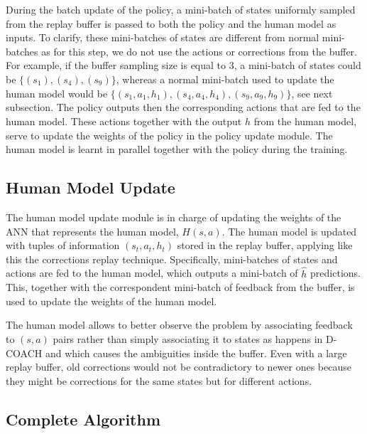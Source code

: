 During the batch update of the policy, a mini-batch of states uniformly sampled from the replay buffer is passed to both the policy and the human model as inputs. To clarify, these mini-batches of states are different from normal mini-batches as for this step, we do not use the actions or corrections from the buffer. For example, if the buffer sampling size is equal to 3, a mini-batch of states could be  $\{(s_1), (s_4), (s_9)\}$, whereas a normal mini-batch used to update the human model would be $\{(s_1, a_1, h_1), (s_4, a_4, h_4), (s_9, a_9, h_9)\}$, see next subsection. The policy outputs then the corresponding actions that are fed to the human model. These actions together with the output $\hat{h}$ from the human model, serve to update the weights of the policy in the policy update module. The human model is learnt in parallel together with the policy during the training. 



\subsection*{Human Model Update}

The human model update module is in charge of updating the weights of the ANN that represents the human model, $H(s, a)$. The human model is updated with tuples of information $(s_t, a_t, h_t)$ stored in the replay buffer, applying like this the corrections replay technique. Specifically, mini-batches of states and actions are fed to the human model, which outputs a mini-batch of $\hat{h}$ predictions. This, together with the correspondent mini-batch of feedback from the buffer, is used to update the weights of the human model.


The human model allows to better observe the problem by associating feedback to $(s, a)$ pairs rather than simply associating it to states as happens in D-COACH and which causes the ambiguities inside the buffer. Even with a large replay buffer, old corrections would not be contradictory to newer ones because they might be corrections for the same states but for different actions.



\subsection*{Complete Algorithm}



